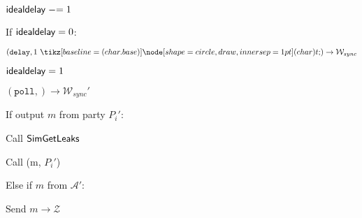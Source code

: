 
\begin{bbox}[title={Algorithm $\msf{Poll}$}]

\begin{renumerate}

  	\item ${\mathsf {idealdelay}} \mathrel{-}= 1$
  	
  	\item If ${\mathsf {idealdelay}} = 0$:
  	 
  		\quad \Send $(\texttt{delay}, 1 \token) \rightarrow \mathcal{W}_{sync}$

  		\quad ${\mathsf {idealdelay}} = 1$

  	\item \Send $(\texttt{poll},) \rightarrow \mathcal{W}_{sync}'$
 
  	\item If output $m$ from party $P_i'$:

			\quad Call ${\mathsf {SimGetLeaks}}$

			\quad Call (m, $P_i'$)
		
		Else if $m$ from $\mathcal{A}'$:

			\quad Send $m \rightarrow \mathcal{Z}$

\end{renumerate}

\end{bbox}
